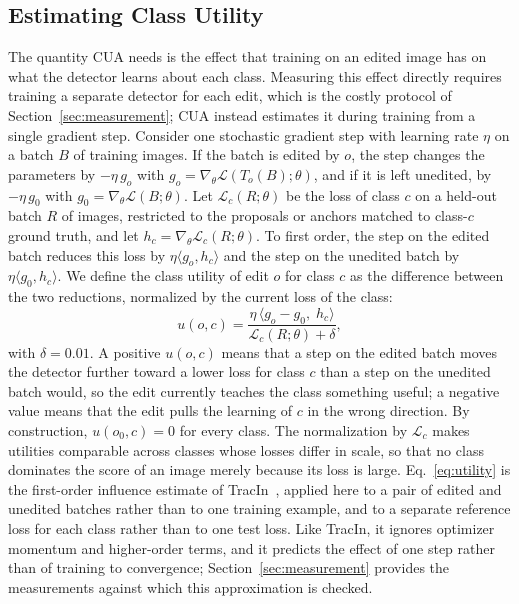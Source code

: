 \documentclass[conference]{IEEEtran}
\begin{document}
\subsection{Estimating Class Utility}
\label{sec:method_estimator}

The quantity CUA needs is the effect that training on an edited image has on what the detector learns about each class. Measuring this effect directly requires training a separate detector for each edit, which is the costly protocol of Section~\ref{sec:measurement}; CUA instead estimates it during training from a single gradient step. Consider one stochastic gradient step with learning rate $\eta$ on a batch $B$ of training images. If the batch is edited by $o$, the step changes the parameters by $-\eta\,g_o$ with $g_o=\nabla_\theta\mathcal{L}(T_o(B);\theta)$, and if it is left unedited, by $-\eta\,g_0$ with $g_0=\nabla_\theta\mathcal{L}(B;\theta)$. Let $\mathcal{L}_c(R;\theta)$ be the loss of class $c$ on a held-out batch $R$ of images, restricted to the proposals or anchors matched to class-$c$ ground truth, and let $h_c=\nabla_\theta\mathcal{L}_c(R;\theta)$. To first order, the step on the edited batch reduces this loss by $\eta\langle g_o,h_c\rangle$ and the step on the unedited batch by $\eta\langle g_0,h_c\rangle$. We define the class utility of edit $o$ for class $c$ as the difference between the two reductions, normalized by the current loss of the class:
\begin{equation}
u(o,c)=\frac{\eta\,\langle g_o-g_0,\;h_c\rangle}{\mathcal{L}_c(R;\theta)+\delta},
\label{eq:utility}
\end{equation}
with $\delta=0.01$. A positive $u(o,c)$ means that a step on the edited batch moves the detector further toward a lower loss for class $c$ than a step on the unedited batch would, so the edit currently teaches the class something useful; a negative value means that the edit pulls the learning of $c$ in the wrong direction. By construction, $u(o_0,c)=0$ for every class. The normalization by $\mathcal{L}_c$ makes utilities comparable across classes whose losses differ in scale, so that no class dominates the score of an image merely because its loss is large. Eq.~\eqref{eq:utility} is the first-order influence estimate of TracIn~\cite{pruthi2020tracin}, applied here to a pair of edited and unedited batches rather than to one training example, and to a separate reference loss for each class rather than to one test loss. Like TracIn, it ignores optimizer momentum and higher-order terms, and it predicts the effect of one step rather than of training to convergence; Section~\ref{sec:measurement} provides the measurements against which this approximation is checked.
\end{document}
